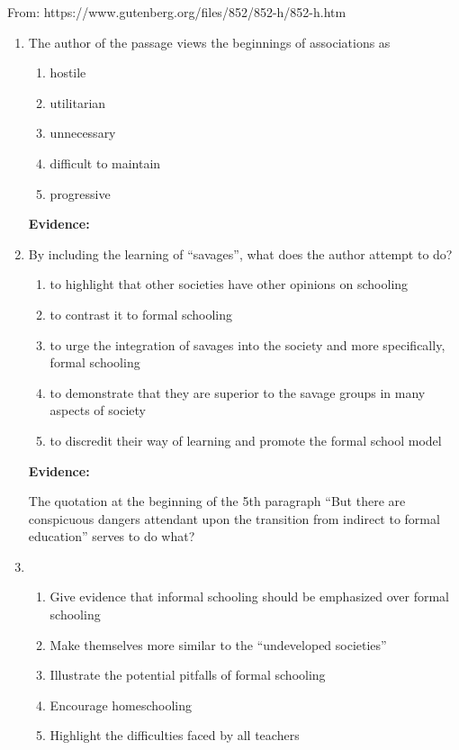 From: https://www.gutenberg.org/files/852/852-h/852-h.htm

\bigskip
\begin{enumerate}

\item 

\bigskip The author of the passage views the beginnings of associations as
\begin{enumerate}[label=(\Alph*)]
\item hostile
\item utilitarian
\item unnecessary
\item difficult to maintain
\item progressive 
\end{enumerate}

\bigskip
\textbf{Evidence:} \hrulefill

\bigskip
\item 

\bigskip By including the learning of ``savages'', what does the author attempt to do?
\begin{enumerate}[label=(\Alph*)]
\item to highlight that other societies have other opinions on schooling
\item to contrast it to formal schooling
\item to urge the integration of savages into the society and more specifically, formal schooling
\item to demonstrate that they are superior to the savage groups in many aspects of society
\item to discredit their way of learning and promote the formal school model
\end{enumerate}

\bigskip
\textbf{Evidence:} \hrulefill

\bigskip The quotation at the beginning of the 5th paragraph ``But there are conspicuous dangers attendant upon the transition from indirect to formal education'' serves to do what?
\item 

\bigskip
\begin{enumerate}[label=(\Alph*)]
\item Give evidence that informal schooling should be emphasized over formal schooling
\item Make themselves more similar to the ``undeveloped societies''
\item Illustrate the potential pitfalls of formal schooling
\item Encourage homeschooling
\item Highlight the difficulties faced by all teachers
\end{enumerate}


\end{enumerate}
